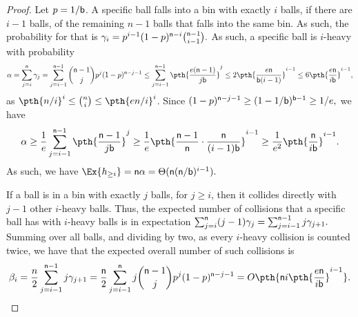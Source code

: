 \begin{proof}
    Let $p = 1/\mathsf{b}$. A specific ball falls into a bin with exactly
    $i$ balls, if there are $i-1$ balls, of the remaining $n-1$ balls
    that falls into the same bin. As such, the probability for that is
    \begin{math}
        \gamma_i = p^{i-1}(1-p)^{\mathsf{n}-i} \binom{\mathsf{n}-1}{i-1}.
    \end{math}
    As such, a specific ball is $i$-heavy with probability
    \begin{equation*}
        \alpha%
        =%
        \sum_{j=i}^\nballs \gamma_j %
        =%
        \sum_{j=i-1}^{\nballs-1} \binom{\nballs-1}{j}
        p^j(1-p)^{\nballs-j-1}%
        \leq%
        \sum_{j=i-1}^{\nballs-1}  \pth{\frac{e(\nballs-1)}{j \nbins}}^j%
        \leq%
        2 \pth{\frac{e \nballs}{\nbins (i-1)}}^{i-1}
        \leq%
        6 \pth{\frac{e \nballs}{i \nbins}}^{i-1},
    \end{equation*}
    as $\pth{ n/i}^i \leq \binom{n}{i} \leq \pth{ e n/i}^i$. Since
    \begin{math}
        (1-p)^{\nballs-j-1}%
        \geq%
        (1-1/\nbins)^{\nbins-1}%
        \geq%
        1/e,
    \end{math}
    we have
    \begin{equation*}
      \alpha%
      \geq%
        \frac{1}{e}
        \sum_{j=i-1}^{\nballs-1}  \pth{\frac{\nballs-1}{j \nbins}}^j\\%
      \geq%
        \frac{1}{e}
        \pth{\frac{\nballs-1}{\nballs}\cdot\frac{\nballs}{(i-1) \nbins}}^{i-1}%
        \geq%
        \frac{1}{e^2}
        \pth{\frac{\nballs}{i \nbins}}^{i-1}.%
    \end{equation*}
    As such, we have
    \begin{math}
        \Ex{\NHX{i}} = \nballs \alpha = \Theta(
        \nballs(\nballs/\nbins)^{i-1} ).
    \end{math}

    If a ball is in a bin with exactly $j$ balls, for $j \geq i$, then
    it collides directly with $j-1$ other $i$-heavy balls. Thus, the
    expected number of collisions that a specific ball has with
    $i$-heavy balls is in expectation
    \begin{math}
        \sum_{j=i}^{\nballs} (j-1) \gamma_j%
        =%
        \sum_{j=i-1}^{\nballs-1} j \gamma_{j+1}.
    \end{math}
    Summing over all balls, and dividing by two, as every $i$-heavy
    collision is counted twice, we have that the expected overall
    number of such collisions is
    \begin{equation*}
        \beta_i%
        =%
        \frac{n}{2}
        \sum_{j=i-1}^{\nballs-1} j \gamma_{j+1}\\
        =%
        \frac{\nballs}{2} \sum_{j=i-1}^{\nballs}
        j \binom{\nballs-1}{j} p^j(1-p)^{\nballs-j-1}%
        =%
        O \pth{ \nballs i \pth{\frac{e \nballs}{i \nbins}}^{i-1}}.
    \end{equation*}
\end{proof}



